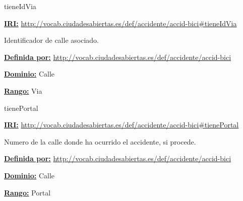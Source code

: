 




\begin{mybox}{tieneIdVia}
\begin{flushleft}
\underline{\textbf{IRI:}}
\url{http://vocab.ciudadesabiertas.es/def/accidente/accid-bici#tieneIdVia}
\newline

Identificador de calle asociado.
\newline

\underline{\textbf{Definida por:}}
\url{http://vocab.ciudadesabiertas.es/def/accidente/accid-bici}
\newline

\underline{\textbf{Dominio:}}
		Calle
\newline

\underline{\textbf{Rango:}}
		Via
\newline


\end{flushleft}
\end{mybox}






\begin{mybox}{tienePortal}
\begin{flushleft}
\underline{\textbf{IRI:}}
\url{http://vocab.ciudadesabiertas.es/def/accidente/accid-bici#tienePortal}
\newline

Numero de la calle donde ha ocurrido el accidente, si procede.
\newline

\underline{\textbf{Definida por:}}
\url{http://vocab.ciudadesabiertas.es/def/accidente/accid-bici}
\newline

\underline{\textbf{Dominio:}} 
	Calle
\newline

\underline{\textbf{Rango:}} 
	Portal
\newline

\end{flushleft}
\end{mybox}








